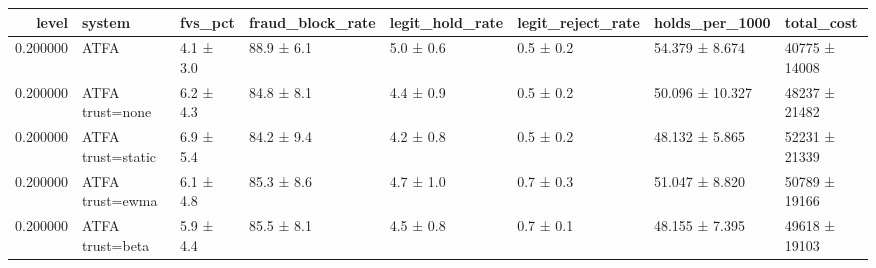 \begin{tabular}{rlllllll}
\toprule
level & system & fvs\_pct & fraud\_block\_rate & legit\_hold\_rate & legit\_reject\_rate & holds\_per\_1000 & total\_cost \\
\midrule
0.200000 & ATFA & 4.1 ± 3.0 & 88.9 ± 6.1 & 5.0 ± 0.6 & 0.5 ± 0.2 & 54.379 ± 8.674 & 40775 ± 14008 \\
0.200000 & ATFA trust=none & 6.2 ± 4.3 & 84.8 ± 8.1 & 4.4 ± 0.9 & 0.5 ± 0.2 & 50.096 ± 10.327 & 48237 ± 21482 \\
0.200000 & ATFA trust=static & 6.9 ± 5.4 & 84.2 ± 9.4 & 4.2 ± 0.8 & 0.5 ± 0.2 & 48.132 ± 5.865 & 52231 ± 21339 \\
0.200000 & ATFA trust=ewma & 6.1 ± 4.8 & 85.3 ± 8.6 & 4.7 ± 1.0 & 0.7 ± 0.3 & 51.047 ± 8.820 & 50789 ± 19166 \\
0.200000 & ATFA trust=beta & 5.9 ± 4.4 & 85.5 ± 8.1 & 4.5 ± 0.8 & 0.7 ± 0.1 & 48.155 ± 7.395 & 49618 ± 19103 \\
\bottomrule
\end{tabular}
